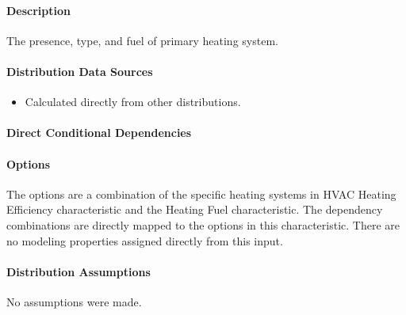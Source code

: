 \paragraph{Description}
% 
The presence, type, and fuel of primary heating system.

\paragraph{Distribution Data Sources}
% 
\begin{itemize}
    \item Calculated directly from other distributions.
\end{itemize}

\paragraph{Direct Conditional Dependencies}


\paragraph{Options}
The options are a combination of the specific heating systems in HVAC Heating Efficiency characteristic and the Heating Fuel characteristic. The dependency combinations are directly mapped to the options in this characteristic. There are no modeling properties assigned directly from this input.

\paragraph{Distribution Assumptions}
% 
No assumptions were made.
